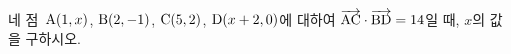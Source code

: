 네 점~$\mathrm{A}(1{,}\mkern3mu\mathopen{}x)$, $\mathrm{B}(2{,}\mkern3mu\mathopen{}-1)$, $\mathrm{C}(5{,}\mkern3mu\mathopen{}2)$, $\mathrm{D}(x+2{,}\mkern3mu\mathopen{}0)$에 대하여 $\overrightarrow{\mathrm{AC}}\cdot\overrightarrow{\mathrm{BD}}=14$일 때, $x$의 값을 구하시오.
